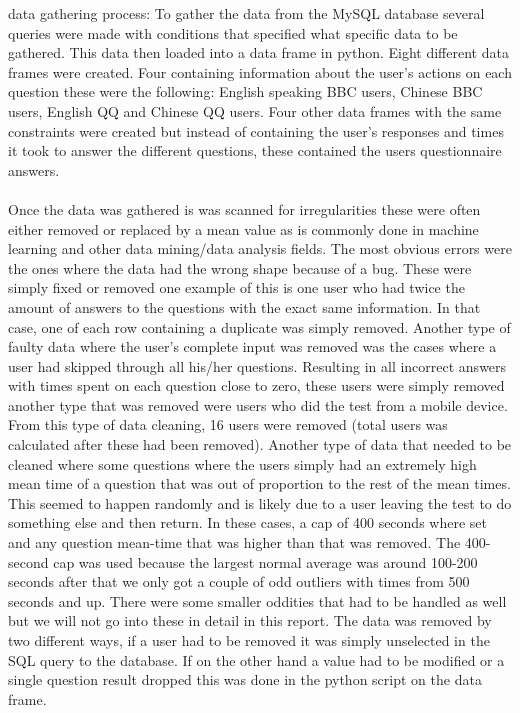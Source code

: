 data gathering process:
To gather the data from the MySQL database several queries were made with conditions that specified what specific data to be gathered. This data then loaded into a data frame in python. Eight different data frames were created. Four containing information about the user's actions on each question these were the following: English speaking BBC users,  Chinese BBC users,  English QQ and Chinese QQ users. Four other data frames with the same constraints were created but instead of containing the user's responses and times it took to answer the different questions, these contained the users questionnaire answers.
\\\\
Once the data was gathered is was scanned for irregularities these were often either removed or replaced by a mean value as is commonly done in machine learning and other data mining/data analysis fields. The most obvious errors were the ones where the data had the wrong shape because of a bug. These were simply fixed or removed one example of this is one user who had twice the amount of answers to the questions with the exact same information. In that case, one of each row containing a duplicate was simply removed. Another type of faulty data where the user's complete input was removed was the cases where a user had skipped through all his/her questions. Resulting in all incorrect answers with times spent on each question close to zero, these users were simply removed another type that was removed were users who did the test from a mobile device. From this type of data cleaning, 16 users were removed (total users was calculated after these had been removed). Another type of data that needed to be cleaned where some questions where the users simply had an extremely high mean time of a question that was out of proportion to the rest of the mean times. This seemed to happen randomly and is likely due to a user leaving the test to do something else and then return. In these cases, a cap of 400 seconds where set and any question mean-time that was higher than that was removed. The 400-second cap was used because the largest normal average was around 100-200 seconds after that we only got a couple of odd outliers with times from 500 seconds and up. There were some smaller oddities that had to be handled as well but we will not go into these in detail in this report. The data was removed by two different ways, if a user had to be removed it was simply unselected in the SQL query to the database. If on the other hand a value had to be modified or a single question result dropped this was done in the python script on the data frame.



